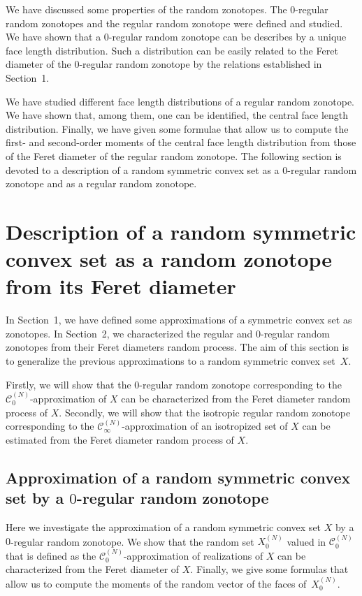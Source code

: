 \documentclass[numbers,compress,v1.0.1]{vmsta}
\theoremstyle{definition}
\begin{document}
We have discussed some properties of the random zonotopes. The
$0$-regular random zonotopes and the regular random zonotope were
defined and studied. We have shown that a $0$-regular random zonotope
can be describes by a unique face length distribution. Such a
distribution can be easily related to the Feret diameter of the
$0$-regular random zonotope by the relations established in
Section~1.

We have studied different face length distributions of a regular random
zonotope. We have shown that, among them, one can be identified, the
central face length distribution. Finally, we have given some formulae
that allow us to compute the first- and second-order moments of the
central face length distribution from those of the Feret diameter of
the regular random zonotope. The following section is devoted to a
description of a random symmetric convex set as a $0$-regular random
zonotope and as a regular random zonotope.
\section{Description of a random symmetric convex set as a random
zonotope from its Feret diameter}

In Section~1, we have defined some approximations of a symmetric convex
set as zonotopes. In Section~2, we characterized the regular and
$0$-regular random zonotopes from their Feret diameters random process.
The aim of this section is to generalize the previous approximations to
a random symmetric convex set~$X$.

Firstly, we will show that the $0$-regular random zonotope
corresponding to the $\mathcal{C}^{(N)}_0$-approximation of $X$ can be
characterized from the Feret diameter random process of $X$. Secondly,
we will show that the isotropic regular random zonotope corresponding
to the $\mathcal{C}^{(N)}_\infty$-approximation of an isotropized set
of $X$ can be estimated from the Feret diameter random process of
$X$.

\subsection{Approximation of a random symmetric convex set by a
$0$-regular random zonotope}
\label{sec:approx0reg}

Here we investigate the approximation of a random symmetric convex set
$X$ by a $0$-regular random zonotope. We show that the random set
$X_0^{(N)}$ valued in $\mathcal{C}_0^{(N)}$ that is defined as the
$\mathcal{C}_0^{(N)}$-approximation of realizations of $X$ can be
characterized from the Feret diameter of $X$. Finally, we give some
formulas that allow us to compute the moments of the random vector of
the faces of~$X_0^{(N)}$.
\end{document}

